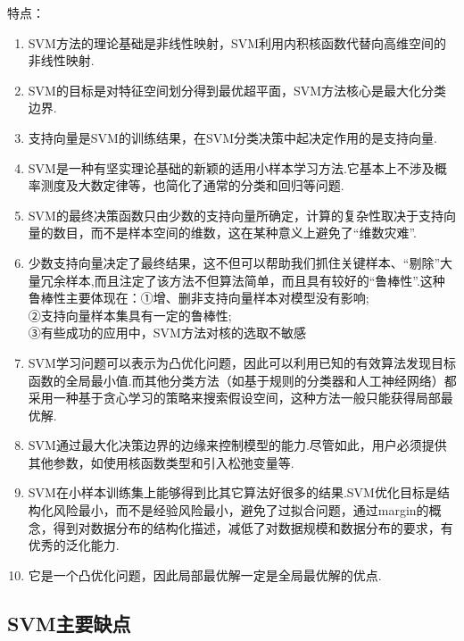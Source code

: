 特点：

\begin{enumerate}
\def\labelenumi{(\arabic{enumi})}
\item
  SVM方法的理论基础是非线性映射，SVM利用内积核函数代替向高维空间的非线性映射.\\
\item
  SVM的目标是对特征空间划分得到最优超平面，SVM方法核心是最大化分类边界.\\
\item
  支持向量是SVM的训练结果，在SVM分类决策中起决定作用的是支持向量.\\
\item
  SVM是一种有坚实理论基础的新颖的适用小样本学习方法.它基本上不涉及概率测度及大数定律等，也简化了通常的分类和回归等问题.
\item
  SVM的最终决策函数只由少数的支持向量所确定，计算的复杂性取决于支持向量的数目，而不是样本空间的维数，这在某种意义上避免了``维数灾难''.\\
\item
  少数支持向量决定了最终结果，这不但可以帮助我们抓住关键样本、``剔除''大量冗余样本,而且注定了该方法不但算法简单，而且具有较好的``鲁棒性''.这种鲁棒性主要体现在：
  ​ ①增、删非支持向量样本对模型没有影响;\\
  ​ ②支持向量样本集具有一定的鲁棒性;\\
  ​ ③有些成功的应用中，SVM方法对核的选取不敏感\\
\item
  SVM学习问题可以表示为凸优化问题，因此可以利用已知的有效算法发现目标函数的全局最小值.而其他分类方法（如基于规则的分类器和人工神经网络）都采用一种基于贪心学习的策略来搜索假设空间，这种方法一般只能获得局部最优解.\\
\item
  SVM通过最大化决策边界的边缘来控制模型的能力.尽管如此，用户必须提供其他参数，如使用核函数类型和引入松弛变量等.
\item
  SVM在小样本训练集上能够得到比其它算法好很多的结果.SVM优化目标是结构化风险最小，而不是经验风险最小，避免了过拟合问题，通过margin的概念，得到对数据分布的结构化描述，减低了对数据规模和数据分布的要求，有优秀的泛化能力.\\
\item
  它是一个凸优化问题，因此局部最优解一定是全局最优解的优点.
\end{enumerate}

\subsection{ SVM主要缺点}\label{svmux4e3bux8981ux7f3aux70b9}

